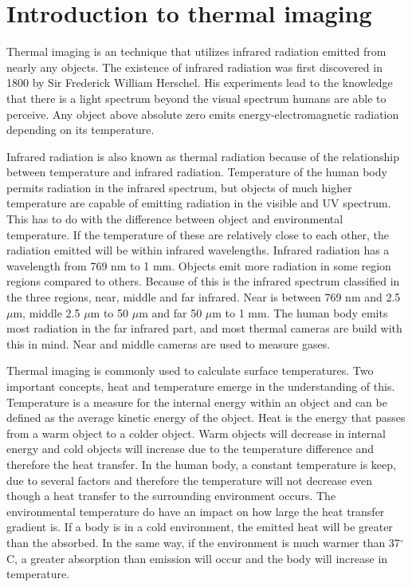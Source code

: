 \section{Introduction to thermal imaging}

Thermal imaging is an technique that utilizes infrared radiation emitted from nearly any objects. 
The existence of infrared radiation was first discovered in 1800 by Sir Frederick William Herschel. 
His experiments lead to the knowledge that there is a light spectrum beyond the visual spectrum humans are able to perceive. Any object above absolute zero emits energy-electromagnetic radiation depending on its temperature.\cite{ignacio2017,optris2009}

Infrared radiation is also known as thermal radiation because of the relationship between temperature and infrared radiation. Temperature of the human body permits radiation in the infrared spectrum, but objects of much higher temperature are capable of emitting radiation in the visible and UV spectrum. This has to do with the difference between object and environmental temperature. If the temperature of these are relatively close to each other, the radiation emitted will be within infrared wavelengths. Infrared radiation has a wavelength from 769 nm to 1 mm. Objects emit more radiation in some region regions compared to others. Because of this is the infrared spectrum classified in the three regions, near, middle and far infrared. Near is between 769 nm and 2.5 $\mu$m, middle 2.5 $\mu$m to 50 $\mu$m and far 50 $\mu$m to 1 mm. The human body emits most radiation in the far infrared part, and most thermal cameras are build with this in mind. Near and middle cameras are used to measure gases.\cite{ignacio2017}

Thermal imaging is commonly used to calculate surface temperatures. Two important concepts, heat and temperature emerge in the understanding of this. Temperature is a measure for the internal energy within an object and can be defined as the average kinetic energy of the object.
Heat is the energy that passes from a warm object to a colder object. Warm objects will decrease in internal energy and cold objects will increase due to the temperature difference and therefore the heat transfer. In the human body, a constant temperature is keep, due to several factors and therefore the temperature will not decrease even though a heat transfer to the surrounding environment occurs. The environmental temperature do have an impact on how large the heat transfer gradient is. If a body is in a cold environment, the emitted heat will be greater than the absorbed. In the same way, if the environment is much warmer than 37$^{\circ}$C, a greater absorption than emission will occur and the body will increase in temperature.\cite{ignacio2017} 

